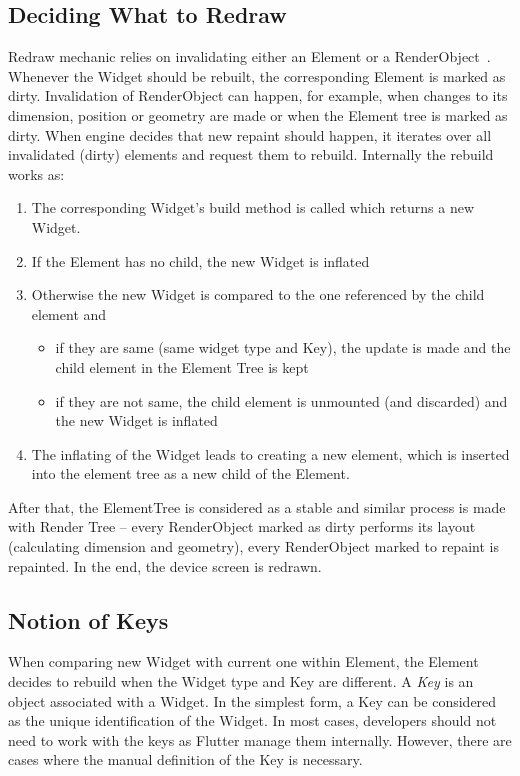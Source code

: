\subsection{Deciding What to Redraw}
Redraw mechanic relies on invalidating either an Element or a RenderObject~\cite{didier-internals}.  Whenever the Widget should be rebuilt, the corresponding Element is marked as dirty. Invalidation of RenderObject can happen, for example, when changes to its dimension, position or geometry are made or when the Element tree is marked as dirty. When engine decides that new repaint should happen, it iterates over all invalidated (dirty) elements and request them to rebuild. Internally the rebuild works as: 
\begin{enumerate}
\item The corresponding Widget's build method is called which returns a new Widget.
\item If the Element has no child, the new Widget is inflated
\item Otherwise the new Widget is compared to the one referenced by the child element and
\begin{itemize}
\item if they are same (same widget type and Key), the update is made and the child element in the Element Tree is kept
\item if they are not same, the child element is unmounted (and discarded) and the new Widget is inflated
\end{itemize}
\item The inflating of the Widget leads to creating a new element, which is inserted into the element tree as a new child of the Element. 
\end{enumerate}

After that, the ElementTree is considered as a stable and similar process is made with Render Tree -- every RenderObject marked as dirty performs its layout (calculating dimension and geometry), every RenderObject marked to repaint is repainted. In the end, the device screen is redrawn. 
\subsection{Notion of Keys}
When comparing new Widget with current one within Element, the Element decides to rebuild when the Widget type and Key are different. A \textit{Key} is an object associated with a Widget. In the simplest form, a Key can be considered as the unique identification of the Widget. In most cases, developers should not need to work with the keys as Flutter manage them internally. However, there are cases where the manual definition of the Key is necessary. 

